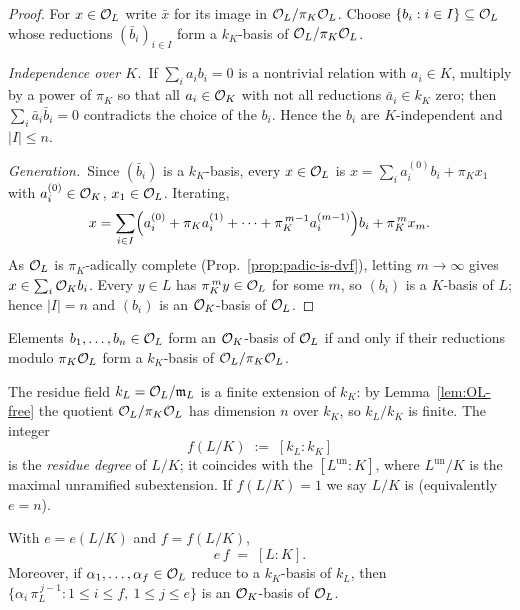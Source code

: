 \begin{proof}
For $x\in\mathcal{O}_L$ write $\bar x$ for its image in $\mathcal{O}_L/\pi_K\mathcal{O}_L$. Choose
$\{b_i:i\in I\}\subseteq\mathcal{O}_L$ whose reductions $(\bar b_i)_{i\in I}$ form a
$k_K$-basis of $\mathcal{O}_L/\pi_K\mathcal{O}_L$.

\emph{Independence over $K$.}\ If $\sum_i a_ib_i=0$ is a nontrivial relation with
$a_i\in K$, multiply by a power of $\pi_K$ so that all $a_i\in\mathcal{O}_K$ with not all
reductions $\bar a_i\in k_K$ zero; then $\sum_i\bar a_i\bar b_i=0$ contradicts
the choice of the $b_i$. Hence the $b_i$ are $K$-independent and $|I|\le n$.

\emph{Generation.}\ Since $(\bar b_i)$ is a $k_K$-basis, every $x\in\mathcal{O}_L$ is
$x=\sum_i a_i^{(0)}b_i+\pi_Kx_1$ with $a_i^{(0)}\in\mathcal{O}_K$, $x_1\in\mathcal{O}_L$. Iterating,
\[
  x=\sum_{i\in I}\Bigl(a_i^{(0)}+\pi_Ka_i^{(1)}+\cdots+\pi_K^{\,m-1}a_i^{(m-1)}\Bigr)b_i
    +\pi_K^{\,m}x_m .
\]
As $\mathcal{O}_L$ is $\pi_K$-adically complete (Prop.~\ref{prop:padic-is-dvf}), letting
$m\to\infty$ gives $x\in\sum_i\mathcal{O}_K b_i$. Every $y\in L$ has $\pi_K^{\,m}y\in\mathcal{O}_L$
for some $m$, so $(b_i)$ is a $K$-basis of $L$; hence $|I|=n$ and $(b_i)$ is an
$\mathcal{O}_K$-basis of $\mathcal{O}_L$.
\end{proof}

\begin{remark}
\label{rem:basis-criterion}
Elements $b_1,\dots,b_n\in\mathcal{O}_L$ form an $\mathcal{O}_K$-basis of $\mathcal{O}_L$ if and only if their
reductions modulo $\pi_K\mathcal{O}_L$ form a $k_K$-basis of $\mathcal{O}_L/\pi_K\mathcal{O}_L$.
\end{remark}

\begin{definition}
\label{def:residue-degree}
\mathlibok
The residue field $k_L=\mathcal{O}_L/\mathfrak{m}_L$ is a finite extension of $k_K$: by
Lemma~\ref{lem:OL-free} the quotient $\mathcal{O}_L/\pi_K\mathcal{O}_L$ has dimension $n$ over
$k_K$, so $k_L/k_K$ is finite. The integer
\[
  f(L/K) \;:=\; [k_L:k_K]
\]
is the \emph{residue degree} of $L/K$; it coincides with the
 $[L^{\mathrm{un}}:K]$, where
$L^{\mathrm{un}}/K$ is the maximal unramified subextension. If $f(L/K)=1$ we say
$L/K$ is  (equivalently $e=n$).
\end{definition}

\begin{proposition}
\label{prop:ef-eq-degree}
\notready
With $e=e(L/K)$ and $f=f(L/K)$,
\[
  e\,f \;=\; [L:K].
\]
Moreover, if $\alpha_1,\dots,\alpha_f\in\mathcal{O}_L$ reduce to a $k_K$-basis of $k_L$,
then $\{\alpha_i\,\pi_L^{\,j-1}:1\le i\le f,\ 1\le j\le e\}$ is an $\mathcal{O}_K$-basis of
$\mathcal{O}_L$.
\end{proposition}

